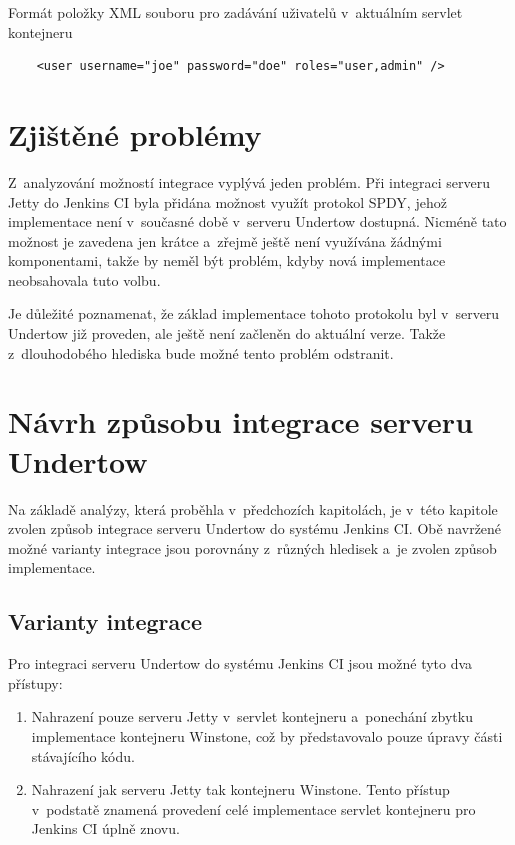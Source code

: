 \begin{priklad} \label{prUsers}
    Formát položky XML souboru pro zadávání uživatelů v~aktuálním servlet kontejneru
\begin{verbatim}
    <user username="joe" password="doe" roles="user,admin" />
\end{verbatim}
\end{priklad}


    \section{Zjištěné problémy} \label{kapSpdy}
        Z~analyzování možností integrace vyplývá jeden problém.
        Při integraci serveru Jetty do Jenkins CI byla přidána
        možnost využít protokol SPDY, jehož implementace
        není v~současné době v~serveru Undertow dostupná. Nicméně tato možnost
        je zavedena jen krátce a~zřejmě ještě není využívána žádnými komponentami,
        takže by neměl být problém, kdyby nová implementace neobsahovala tuto volbu.
        
        Je důležité poznamenat, že základ implementace tohoto protokolu byl
        v~serveru Undertow již proveden, ale ještě není začleněn do aktuální 
        verze. Takže z~dlouhodobého hlediska bude možné tento problém odstranit.

    \section{Návrh způsobu integrace serveru Undertow} \label{secNavrh}
        Na základě analýzy, která proběhla v~předchozích kapitolách,
        je v~této kapitole zvolen způsob
        integrace serveru Undertow do systému Jenkins CI. 
        Obě navržené možné varianty integrace jsou porovnány z~různých
        hledisek a~je zvolen způsob implementace.

                
        \subsection{Varianty integrace}
            Pro integraci serveru Undertow do systému Jenkins CI jsou možné tyto dva přístupy:

            \begin{enumerate}
                \item{Nahrazení pouze serveru Jetty v~servlet kontejneru a~ponechání
                    zbytku implementace kontejneru Winstone, což by představovalo
                    pouze úpravy části stávajícího kódu. }

                \item{Nahrazení jak serveru Jetty tak kontejneru Winstone. 
                    Tento přístup v~podstatě znamená provedení celé implementace
                    servlet kontejneru pro Jenkins CI úplně znovu.}
            \end{enumerate}

